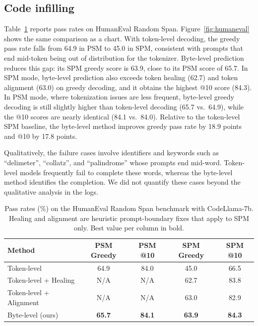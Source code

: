 \documentclass{article} %
\begin{document}
\subsection{Code infilling}
Table~\ref{tab:humaneval} reports pass rates on HumanEval Random Span. Figure~\ref{fig:humaneval} shows the same comparison as a chart. With token-level decoding, the greedy pass rate falls from 64.9 in PSM to 45.0 in SPM, consistent with prompts that end mid-token being out of distribution for the tokenizer. Byte-level prediction reduces this gap: its SPM greedy score is 63.9, close to its PSM score of 65.7. In SPM mode, byte-level prediction also exceeds token healing (62.7) and token alignment (63.0) on greedy decoding, and it obtains the highest @10 score (84.3). In PSM mode, where tokenization issues are less frequent, byte-level greedy decoding is still slightly higher than token-level decoding (65.7 vs.\ 64.9), while the @10 scores are nearly identical (84.1 vs.\ 84.0). Relative to the token-level SPM baseline, the byte-level method improves greedy pass rate by 18.9 points and @10 by 17.8 points.

Qualitatively, the failure cases involve identifiers and keywords such as ``delimeter'', ``collatz'', and ``palindrome'' whose prompts end mid-word. Token-level models frequently fail to complete these words, whereas the byte-level method identifies the completion. We did not quantify these cases beyond the qualitative analysis in the logs.

\begin{table}[t]
\caption{Pass rates (\%) on the HumanEval Random Span benchmark with CodeLlama-7b. Healing and alignment are heuristic prompt-boundary fixes that apply to SPM only. Best value per column in bold.}
\label{tab:humaneval}
\begin{center}
\begin{tabular}{lcccc}
\toprule
Method & PSM Greedy & PSM @10 & SPM Greedy & SPM @10 \\
\midrule
Token-level & 64.9 & 84.0 & 45.0 & 66.5 \\
Token-level + Healing & N/A & N/A & 62.7 & 83.8 \\
Token-level + Alignment & N/A & N/A & 63.0 & 82.9 \\
Byte-level (ours) & \textbf{65.7} & \textbf{84.1} & \textbf{63.9} & \textbf{84.3} \\
\bottomrule
\end{tabular}
\end{center}
\end{table}
\end{document}
